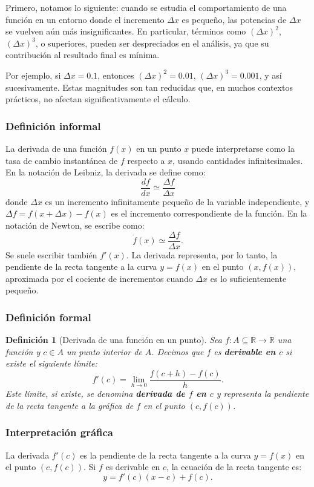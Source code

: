 \documentclass[12pt, a4paper]{article}
\theoremstyle{rioplatense}
\newtheorem{definicion}{Definición}[section]
\begin{document}
Primero, notamos lo siguiente: cuando se estudia el comportamiento de una función en un entorno donde el incremento $\Delta x$ es pequeño, las potencias de $\Delta x$ se vuelven aún más insignificantes. En particular, términos como $(\Delta x)^2$, $(\Delta x)^3$, o superiores, pueden ser despreciados en el análisis, ya que su contribución al resultado final es mínima.

Por ejemplo, si $\Delta x = 0.1$, entonces $(\Delta x)^2 = 0.01$, $(\Delta x)^3 = 0.001$, y así sucesivamente. Estas magnitudes son tan reducidas que, en muchos contextos prácticos, no afectan significativamente el cálculo. 

\subsubsection{Definición informal}

La derivada de una función $f(x)$ en un punto $x$ puede interpretarse como la tasa de cambio instantánea de $f$ respecto a $x$, usando cantidades infinitesimales.
En la notación de Leibniz, la derivada se define como:
$$
\frac{df}{dx} \simeq \frac{\Delta f}{\Delta x}
$$
donde $\Delta x$ es un incremento infinitamente pequeño de la variable independiente, y $\Delta f = f(x + \Delta x) - f(x)$ es el incremento correspondiente de la función.
En la notación de Newton, se escribe como:
$$
\dot{f}(x) \simeq \frac{\Delta f}{\Delta x}.
$$
Se suele escribir tambi\'en $f'(x)$.
La derivada representa, por lo tanto, la pendiente de la recta tangente a la curva $y = f(x)$ en el punto $(x, f(x))$, aproximada por el cociente de incrementos cuando $\Delta x$ es lo suficientemente pequeño.

\subsubsection{Definición formal}
\begin{definicion}[Derivada de una función en un punto]
    Sea $f: A \subseteq \mathbb{R} \to \mathbb{R}$ una función y $c \in A$ un punto interior de $A$. Decimos que $f$ es \textbf{derivable en $c$} si existe el siguiente límite:
    $$
    f'(c) = \lim_{h \to 0} \frac{f(c + h) - f(c)}{h}.
    $$
    Este límite, si existe, se denomina \textbf{derivada de $f$ en $c$} y representa la pendiente de la recta tangente a la gráfica de $f$ en el punto $(c, f(c))$.
\end{definicion}

\subsubsection{Interpretación gráfica}
La derivada $f'(c)$ es la pendiente de la recta tangente a la curva $y = f(x)$ en el punto $(c, f(c))$. Si $f$ es derivable en $c$, la ecuación de la recta tangente es:
$$
y = f'(c)(x - c) + f(c).
$$
\end{document}
